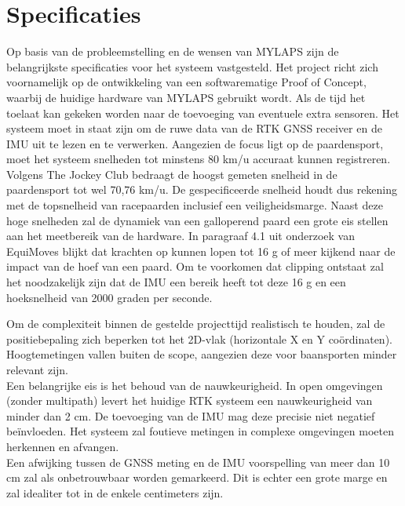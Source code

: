 
\section{Specificaties}
Op basis van de probleemstelling en de wensen van MYLAPS zijn de belangrijkste specificaties voor het systeem vastgesteld. Het project richt zich voornamelijk op de ontwikkeling van een softwarematige Proof of Concept, waarbij de huidige hardware van MYLAPS gebruikt wordt. Als de tijd het toelaat kan gekeken worden naar de toevoeging van eventuele extra sensoren. Het systeem moet in staat zijn om de ruwe data van de RTK GNSS receiver en de IMU uit te lezen en te verwerken. Aangezien de focus ligt op de paardensport, moet het systeem snelheden tot minstens 80 km/u accuraat kunnen registreren. Volgens The Jockey Club \cite{jockeyclub_racehorses} bedraagt de hoogst gemeten snelheid in de paardensport tot wel 70,76 km/u. De gespecificeerde snelheid houdt dus rekening met de topsnelheid van racepaarden inclusief een veiligheidsmarge. Naast deze hoge snelheden zal de dynamiek van een galloperend paard een grote eis stellen aan het meetbereik van de hardware. In paragraaf 4.1 uit onderzoek van EquiMoves \cite{bosch2018equimoves} blijkt dat krachten op kunnen lopen tot 16 g of meer kijkend naar de impact van de hoef van een paard. Om te voorkomen dat clipping ontstaat zal het noodzakelijk zijn dat de IMU een bereik heeft tot deze 16 g en een hoeksnelheid van 2000 graden per seconde.

Om de complexiteit binnen de gestelde projecttijd realistisch te houden, zal de positiebepaling zich beperken tot het 2D-vlak (horizontale X en Y coördinaten). Hoogtemetingen vallen buiten de scope, aangezien deze voor baansporten minder relevant zijn. \\

Een belangrijke eis is het behoud van de nauwkeurigheid. In open omgevingen (zonder multipath) levert het huidige RTK systeem een nauwkeurigheid van minder dan 2 cm. De toevoeging van de IMU mag deze precisie niet negatief beïnvloeden. Het systeem zal foutieve metingen in complexe omgevingen moeten herkennen en afvangen. \\

Een afwijking tussen de GNSS meting en de IMU voorspelling van meer dan 10 cm zal als onbetrouwbaar worden gemarkeerd. Dit is echter een grote marge en zal idealiter tot in de enkele centimeters zijn. \\

